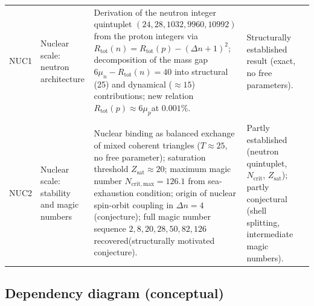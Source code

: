 \documentclass[11pt,a4paper]{article}
\begin{document}
\begin{longtable}{L{0.8cm}L{1.9cm}L{5.9cm}L{3cm}L{2.2cm}}
NUC1 &
Nuclear scale: neutron architecture &
Derivation of the neutron integer quintuplet $(24,28,1032,9960,10992)$ from the proton integers via $R_{\mathrm{tot}}(n) = R_{\mathrm{tot}}(p) - (\Delta n+1)^2$; decomposition of the mass gap $6\mu_n - R_{\mathrm{tot}}(n) = 40$ into structural (25) and dynamical ($\approx 15$) contributions; new relation $R_{\mathrm{tot}}(p) \approx 6\mu_p$at $0.001\%$. &
Structurally established result (exact, no free parameters). & \citep{Nuclear_Stability_PDL_2026} \\\\[0.4em]

NUC2 &
Nuclear scale: stability and magic numbers &
Nuclear binding as balanced exchange of mixed coherent triangles ($T \approx 25$, no free parameter); saturation threshold $Z_{\mathrm{sat}} \approx 20$; maximum magic number $N_{\mathrm{crit,max}} = 126.1$ from sea-exhaustion condition; origin of nuclear spin-orbit coupling in $\Delta n = 4$ (conjecture); full magic number sequence $2,8,20,28,50,82,126$ recovered(structurally motivated conjecture). & 
Partly established (neutron quintuplet, $N_{\mathrm{crit}}$, $Z_{\mathrm{sat}}$); partly conjectural (shell splitting, intermediate magic numbers). & \citep{Nuclear_Stability_PDL_2026} \\[0.4em]

\end{longtable}

\subsection{Dependency diagram (conceptual)}
\end{document}
